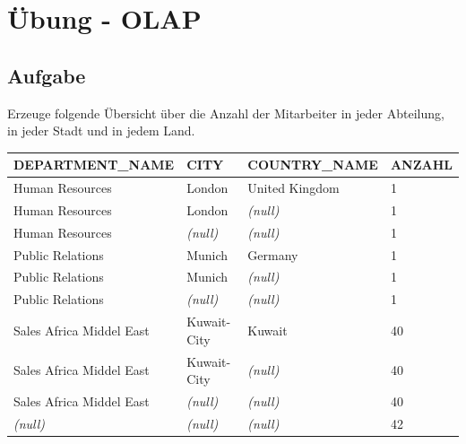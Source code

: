 \section{Übung - OLAP}
\label{sec:uebung_06}

\subsection{Aufgabe}
\label{sec:uebung_06.aufgabe_01}
Erzeuge folgende Übersicht über die Anzahl der Mitarbeiter in jeder Abteilung, in jeder Stadt und in jedem Land.

\begin{table}[H]
  \centering
  \ttfamily
  \small
  \begin{tabular}{|l|l|l|l|}
    \hline
    \textbf{DEPARTMENT\_NAME}  & \textbf{CITY}   & \textbf{COUNTRY\_NAME}   & \textbf{ANZAHL}   \\
    \hline
    Human Resources           & London          & United Kingdom          & 1                 \\
    Human Resources           & London          & \textit{(null)}         & 1                 \\
    Human Resources           & \textit{(null)} & \textit{(null)}         & 1                 \\
    Public Relations          & Munich          & Germany                 & 1                 \\
    Public Relations          & Munich          & \textit{(null)}         & 1                 \\
    Public Relations          & \textit{(null)} & \textit{(null)}         & 1                 \\
    Sales Africa Middel East  & Kuwait-City     & Kuwait                  & 40                \\
    Sales Africa Middel East  & Kuwait-City     & \textit{(null)}         & 40                \\
    Sales Africa Middel East  & \textit{(null)} & \textit{(null)}         & 40                \\
    \textit{(null)}           & \textit{(null)} & \textit{(null)}         & 42                \\
    \hline
  \end{tabular}
\end{table}

